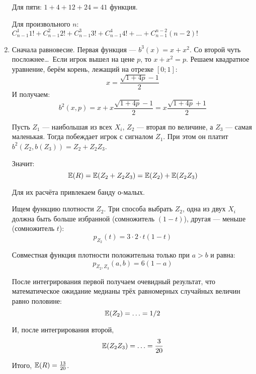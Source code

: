\begin{enumerate}
Для пяти: $1+4+12+24=41$ функция.

Для произвольного $ n $: $ C_{n-1}^{1}1!+C_{n-1}^{2}2!+C_{n-1}^{3}3!+C_{n-1}^{4}4!+\ldots +C_{n-1}^{n-2}(n-2)! $


\item Сначала равновесие. Первая функция — $ b^{3}(x)=x+x^{2} $. Со второй чуть посложнее\ldots~Если игрок вышел на цене $ p $, то $ x+x^{2}=p $. Решаем квадратное уравнение, берём корень, лежащий на отрезке $ [0;1] $:
\begin{equation}
x=\frac{\sqrt{1+4p}-1}{2}
\end{equation}
И получаем:
\begin{equation}
b^{2}(x,p)=x+x\frac{\sqrt{1+4p}-1}{2}=x\frac{\sqrt{1+4p}+1}{2}
\end{equation}

Пусть $ Z_{1} $ — наибольшая из всех $ X_{i} $, $ Z_{2} $ — вторая по величине, а $ Z_{3} $ — самая маленькая. Тогда побеждает игрок с сигналом $ Z_{1} $. При этом он платит $ b^{2}(Z_{2},b(Z_{3}))=Z_{2}+Z_{2}Z_{3} $.

Значит:
\begin{equation}
\operatorname{\mathbb{E}}(R)=\operatorname{\mathbb{E}}(Z_{2}+Z_{2}Z_{3})=\operatorname{\mathbb{E}}(Z_{2})+\operatorname{\mathbb{E}}(Z_{2}Z_{3})
\end{equation}

Для их расчёта привлекаем банду о-малых.


Ищем функцию плотности $ Z_{2} $. Три способа выбрать $ Z_{2} $, одна из двух $ X_{i} $ должна быть больше избранной (сомножитель $ (1-t) $), другая — меньше (сомножитель $ t $):
\begin{equation}
p_{Z_{2}}(t)=3\cdot 2\cdot t(1-t)
\end{equation}

Совместная функция плотности положительна только при $ a>b $ и равна:
\begin{equation}
p_{Z_{2},Z_{3}}(a,b)=6(1-a)
\end{equation}

После интегрирования первой получаем очевидный результат, что математическое ожидание медианы трёх равномерных случайных величин равно половине:
\begin{equation}
\operatorname{\mathbb{E}}(Z_{2})=\ldots=1/2
\end{equation}

И, после интегрирования второй,
\begin{equation}
\operatorname{\mathbb{E}}(Z_{2}Z_{3})=\ldots=\frac{3}{20}
\end{equation}

Итого, $ \operatorname{\mathbb{E}}(R)=\frac{13}{20} $.


\end{enumerate}
